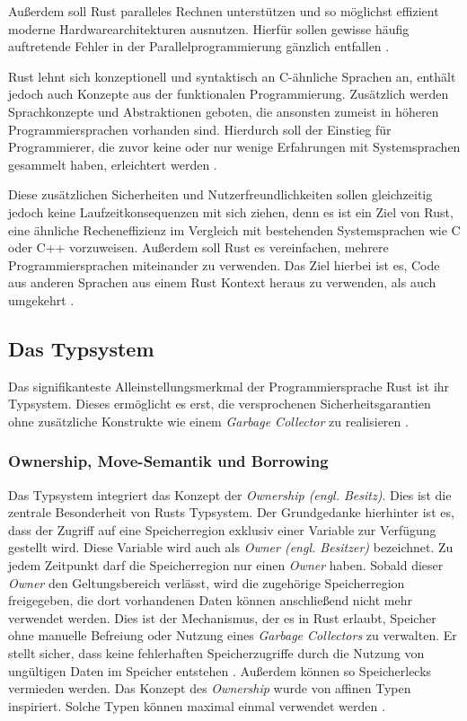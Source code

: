 Außerdem soll Rust paralleles Rechnen unterstützen und
so möglichst effizient moderne Hardwarearchitekturen ausnutzen.
Hierfür sollen gewisse häufig auftretende Fehler in der Parallelprogrammierung gänzlich entfallen
\cite{theRustLanguage}.

Rust lehnt sich konzeptionell und syntaktisch an C-ähnliche Sprachen an, enthält jedoch auch Konzepte aus der
funktionalen Programmierung. Zusätzlich werden Sprachkonzepte und Abstraktionen geboten, die
ansonsten zumeist in höheren Programmiersprachen vorhanden sind. Hierdurch soll der Einstieg für
Programmierer, die zuvor keine oder nur wenige Erfahrungen mit Systemsprachen gesammelt haben, erleichtert werden
\cite{engineeringServo}.

Diese zusätzlichen Sicherheiten und Nutzerfreundlichkeiten sollen gleichzeitig jedoch keine Laufzeitkonsequenzen mit 
sich ziehen, denn es ist ein Ziel von Rust, 
eine ähnliche Recheneffizienz im Vergleich mit bestehenden Systemsprachen wie C oder C++ vorzuweisen.
Außerdem soll Rust es vereinfachen, mehrere Programmiersprachen miteinander zu verwenden.
Das Ziel hierbei ist es, Code aus anderen Sprachen aus einem Rust Kontext heraus zu verwenden, als auch umgekehrt
\cite{rustBook}.


\subsection{Das Typsystem}\label{sec:rust_type_system}

Das signifikanteste Alleinstellungsmerkmal der Programmiersprache Rust ist ihr Typsystem. Dieses ermöglicht es
erst, die versprochenen Sicherheitsgarantien ohne zusätzliche Konstrukte wie einem \textit{Garbage Collector}
zu realisieren \cite{rustBook}.

\subsubsection{Ownership, Move-Semantik und Borrowing}

Das Typsystem integriert das Konzept der \textit{Ownership (engl. Besitz)}.
Dies ist die zentrale Besonderheit von Rusts Typsystem.
Der Grundgedanke hierhinter ist es, dass der Zugriff auf eine Speicherregion exklusiv einer Variable
zur Verfügung gestellt wird. Diese Variable wird auch als \textit{Owner (engl. Besitzer)} bezeichnet.
Zu jedem Zeitpunkt darf die Speicherregion nur einen \textit{Owner} haben.
Sobald dieser \textit{Owner} den Geltungsbereich verlässt, wird die zugehörige Speicherregion freigegeben,
die dort vorhandenen Daten können anschließend nicht mehr verwendet werden.
Dies ist der Mechanismus, der es in Rust erlaubt, Speicher ohne manuelle Befreiung oder Nutzung eines
\textit{Garbage Collectors} zu verwalten. Er stellt sicher, dass keine fehlerhaften Speicherzugriffe
durch die Nutzung von ungültigen Daten im Speicher entstehen \cite{rustBook}. Außerdem können so Speicherlecks
vermieden werden.
Das Konzept des \textit{Ownership} wurde von affinen Typen inspiriert.\cite{embeddedRustOS}
Solche Typen können maximal einmal verwendet werden \cite{affineTypes}.

